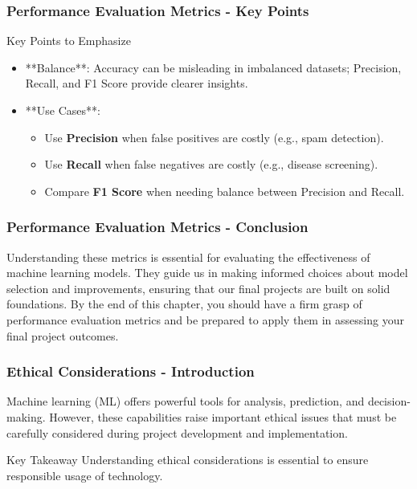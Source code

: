 \documentclass[aspectratio=169]{beamer}
\begin{document}
\begin{frame}[fragile]
    \frametitle{Performance Evaluation Metrics - Key Points}
    \begin{block}{Key Points to Emphasize}
        \begin{itemize}
            \item **Balance**: Accuracy can be misleading in imbalanced datasets; Precision, Recall, and F1 Score provide clearer insights.
            \item **Use Cases**:
                \begin{itemize}
                    \item Use \textbf{Precision} when false positives are costly (e.g., spam detection).
                    \item Use \textbf{Recall} when false negatives are costly (e.g., disease screening).
                    \item Compare \textbf{F1 Score} when needing balance between Precision and Recall.
                \end{itemize}
        \end{itemize}
    \end{block}
\end{frame}

\begin{frame}[fragile]
    \frametitle{Performance Evaluation Metrics - Conclusion}
    Understanding these metrics is essential for evaluating the effectiveness of machine learning models. 
    They guide us in making informed choices about model selection and improvements, ensuring that our final 
    projects are built on solid foundations. By the end of this chapter, you should have a firm grasp of performance 
    evaluation metrics and be prepared to apply them in assessing your final project outcomes.
\end{frame}

\begin{frame}[fragile]
    \frametitle{Ethical Considerations - Introduction}
    Machine learning (ML) offers powerful tools for analysis, prediction, and decision-making. However, these capabilities raise important ethical issues that must be carefully considered during project development and implementation.
    
    \begin{block}{Key Takeaway}
        Understanding ethical considerations is essential to ensure responsible usage of technology.
    \end{block}
\end{frame}
\end{document}
